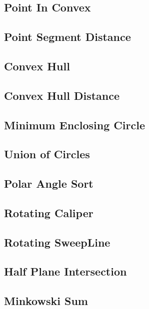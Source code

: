 \subsection{Point In Convex}

\subsection{Point Segment Distance}

\subsection{Convex Hull}

\subsection{Convex Hull Distance}

\subsection{Minimum Enclosing Circle}

\subsection{Union of Circles}

\subsection{Polar Angle Sort}

\subsection{Rotating Caliper}

\subsection{Rotating SweepLine}

\subsection{Half Plane Intersection}

\subsection{Minkowski Sum}


